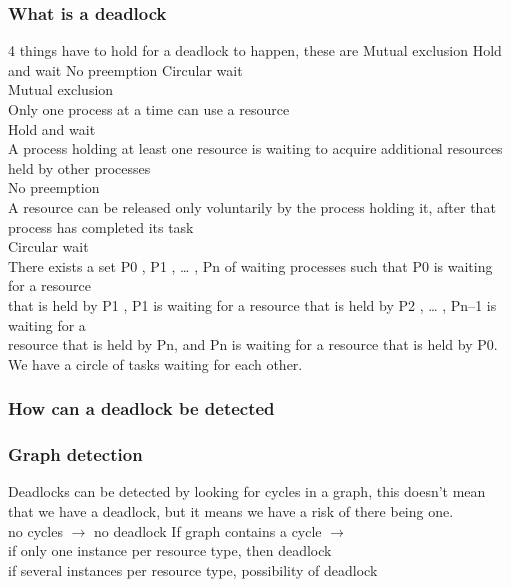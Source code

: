 \documentclass[a4paper,10pt,titlepage]{report}
\begin{document}
\subsubsection{What is a deadlock}
4 things have to hold for a deadlock to happen, these are Mutual exclusion
Hold and wait
No preemption
Circular wait
\\
Mutual exclusion\\
\hspace{10mm} Only one process at a time can use a resource\\
Hold and wait\\
\hspace{10mm} A process holding at least one resource is waiting to acquire additional
resources held by other processes \\
No preemption\\
\hspace{10mm} A resource can be released only voluntarily by the process holding it, after
that process has completed its task \\ 
Circular wait\\
\hspace{10mm} There exists a set {P0 , P1 , … , Pn } of waiting processes such that P0 is waiting
for a resource \\
\hspace{10mm} that is held by P1 , P1 is waiting for a resource that is held by
P2 , … , Pn–1 is waiting for a \\
\hspace{10mm}resource that is held by Pn, and Pn is waiting for a
resource that is held by P0. \\
\vspace{2mm} 
\hspace{10mm}We have a circle of tasks waiting for each other.
\\
\subsubsection{How can a deadlock be detected}

\subsubsection{Graph detection}
Deadlocks can be detected by looking for cycles in a graph, this doesn't mean that we have a deadlock, but it means we have a risk of there being one.\\
no cycles  $\rightarrow $ no deadlock
If graph contains a cycle $\rightarrow $ \\
\hspace{10mm} if only one instance per resource type, then deadlock
\\
\hspace{10mm} if several instances per resource type, possibility of deadlock
\end{document}
